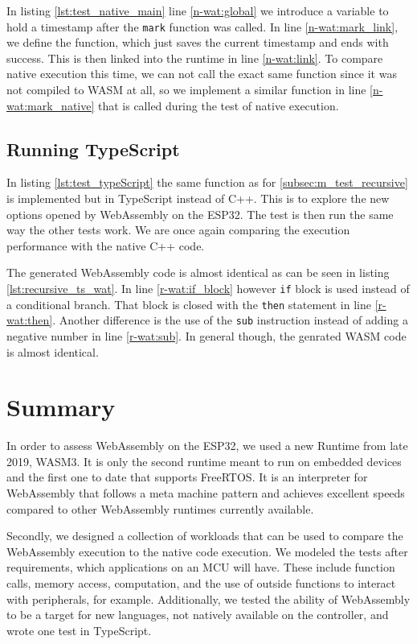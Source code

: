 

In listing \ref{lst:test_native_main} line \ref{n-wat:global} we introduce a variable to hold a timestamp after the \lstinline{mark} function was called. In line \ref{n-wat:mark_link}, we define the function, which just saves the current timestamp and ends with success. This is then linked into the runtime in line \ref{n-wat:link}. To compare native execution this time, we can not call the exact same function since it was not compiled to WASM at all, so we implement a similar function in line \ref{n-wat:mark_native} that is called during the test of native execution.

\subsection{Running TypeScript}\label{subsec:typeScript}

In listing \ref{lst:test_typeScript} the same function as for \ref{subsec:m_test_recursive} is implemented but in TypeScript instead of C++. This is to explore the new options opened by WebAssembly on the ESP32. The test is then run the same way the other tests work. We are once again comparing the execution performance with the native C++ code.



The generated WebAssembly code is almost identical as can be seen in listing \ref{lst:recursive_ts_wat}. In line \ref{r-wat:if_block} however \lstinline{if} block is used instead of a conditional branch. That block is closed with the \lstinline{then} statement in line \ref{r-wat:then}. Another difference is the use of the \lstinline{sub} instruction instead of adding a negative number in line \ref{r-wat:sub}. In general though, the genrated WASM code is almost identical.



\section{Summary}

In order to assess WebAssembly on the ESP32, we used a new Runtime from late 2019, WASM3. It is only the second runtime meant to run on embedded devices and the first one to date that supports FreeRTOS. It is an interpreter for WebAssembly that follows a meta machine pattern and achieves excellent speeds compared to other WebAssembly runtimes currently available.

Secondly, we designed a collection of workloads that can be used to compare the WebAssembly execution to the native code execution. We modeled the tests after requirements, which applications on an MCU will have. These include function calls, memory access, computation, and the use of outside functions to interact with peripherals, for example. Additionally, we tested the ability of WebAssembly to be a target for new languages, not natively available on the controller, and wrote one test in TypeScript.